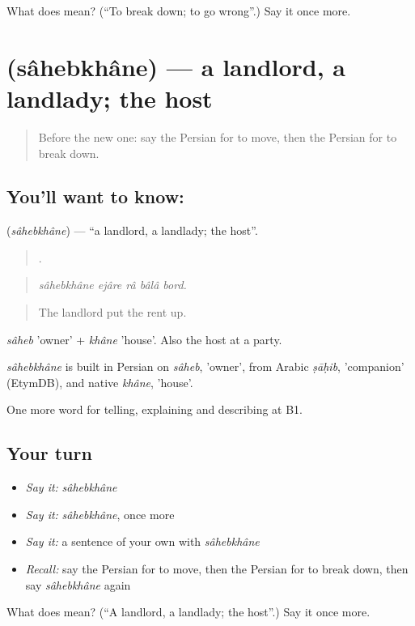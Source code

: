 \begin{tcolorbox}[breakable,colback=teal!4,colframe=teal!35!black,title={Before you move on}]
What does   mean? (\textquotedblleft{}To break down; to go wrong\textquotedblright{}.) Say it once more.
\end{tcolorbox}
\section[\texorpdfstring{\fa{صاحبخانه} (sâhebkhâne)}{صاحبخانه (sâhebkhâne)}]{ (sâhebkhâne) — a landlord, a landlady; the host}

\label{lesson:FA-C537-sahebkhane}



\begin{quote}
Before the new one: say the Persian for to move, then the Persian for to break down.
\end{quote}

\subsection*{You'll want to know: }
\textbf{} (\emph{sâhebkhâne}) — \textquotedblleft{}a landlord, a landlady; the host\textquotedblright{}.

\begin{quote}
    .
\end{quote}

\begin{quote}
\emph{sâhebkhâne ejâre râ bâlâ bord.}
\end{quote}

\begin{quote}
The landlord put the rent up.
\end{quote}

\emph{sâheb} 'owner' + \emph{khâne} 'house'. Also the host at a party.

\begin{cousinweb}
\emph{sâhebkhâne} is built in Persian on \emph{sâheb}, 'owner', from Arabic \emph{ṣāḥib}, 'companion' (EtymDB), and native \emph{khâne}, 'house'.
\end{cousinweb}

\begin{grammarlens}[title={What you've built}]
One more word for telling, explaining and describing at B1.
\end{grammarlens}

\subsection*{Your turn}
\begin{itemize}
\raggedright
  \item \emph{Say it:} \emph{sâhebkhâne}
  \item \emph{Say it:} \emph{sâhebkhâne}, once more
  \item \emph{Say it:} a sentence of your own with \emph{sâhebkhâne}
  \item \emph{Recall:} say the Persian for to move, then the Persian for to break down, then say \emph{sâhebkhâne} again
\end{itemize}

\begin{tcolorbox}[breakable,colback=teal!4,colframe=teal!35!black,title={Before you move on}]
What does  mean? (\textquotedblleft{}A landlord, a landlady; the host\textquotedblright{}.) Say it once more.
\end{tcolorbox}
